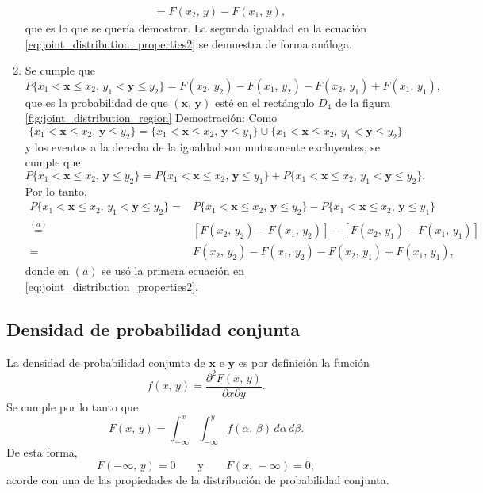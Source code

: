\documentclass[a4paper]{report}
\newcommand{\x}{\mathbf{x}}
\newcommand{\y}{\mathbf{y}}
\begin{document}
\begin{enumerate}[1.]
\begin{align*}
   &=F(x_2,\,y)-F(x_1,\,y),
\end{align*}
que es lo que se quería demostrar. La segunda igualdad en la ecuación \ref{eq:joint_distribution_properties2} se demuestra de forma análoga.
\item Se cumple que
\begin{equation}\label{eq:joint_distribution_rectangular_region}
  P\{x_1<\x\leq x_2,\,y_1<\y\leq y_2\}=F(x_2,\,y_2)-F(x_1,\,y_2)-F(x_2,\,y_1)+F(x_1,\,y_1),
\end{equation}
que es la probabilidad de que \((\x,\,\y)\) esté en el rectángulo \(D_4\) de la figura \ref{fig:joint_distribution_region}
Demostración: Como
\[
 \{x_1<\x\leq x_2,\,\y\leq y_2\}=\{x_1<\x\leq x_2,\,\y\leq y_1\}\cup\{x_1<\x\leq x_2,\,y_1<\y\leq y_2\}
\]
y los eventos a la derecha de la igualdad son mutuamente excluyentes, se cumple que
\[
 P\{x_1<\x\leq x_2,\,\y\leq y_2\}=P\{x_1<\x\leq x_2,\,\y\leq y_1\}+P\{x_1<\x\leq x_2,\,y_1<\y\leq y_2\}.
\]
Por lo tanto,
\begin{align*}
 P\{x_1<\x\leq x_2,\,y_1<\y\leq y_2\}=&P\{x_1<\x\leq x_2,\,\y\leq y_2\}-P\{x_1<\x\leq x_2,\,\y\leq y_1\}\\
  \overset{(a)}{=}&\left[F(x_2,\,y_2)-F(x_1,\,y_2)\right]-\left[F(x_2,\,y_1)-F(x_1,\,y_1)\right]\\
  =&F(x_2,\,y_2)-F(x_1,\,y_2)-F(x_2,\,y_1)+F(x_1,\,y_1),
\end{align*}
donde en \((a)\) se usó la primera ecuación en \ref{eq:joint_distribution_properties2}.
\end{enumerate}

\subsection{Densidad de probabilidad conjunta}
La densidad de probabilidad conjunta de \(\x\) e \(\y\) es por definición la función
\begin{equation}\label{eq:joint_density_definition}
 f(x,\,y)=\frac{\partial^2F(x,\,y)}{\partial x\partial y}.
\end{equation}
Se cumple por lo tanto que
\[
 F(x,\,y)=\int_{-\infty}^{x}\int_{-\infty}^{y}f(\alpha,\,\beta)\,d\alpha\,d\beta.
\]
De esta forma,
\[
 F(-\infty,\,y)=0\qquad\textrm{y}\qquad F(x,\,-\infty)=0,
\]
acorde con una de las propiedades de la distribución de probabilidad conjunta.
\end{document}
